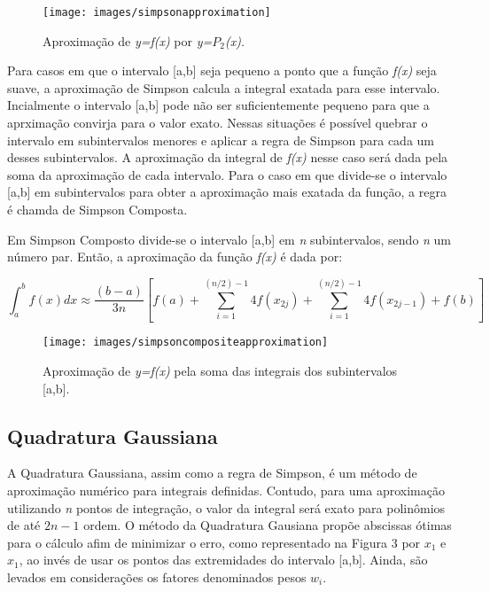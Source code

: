 \documentclass[12pt,a4paper]{article}
\begin{document}
\begin{figure}[h]
\texttt{[image: images/simpsonapproximation]}
\caption{Aproximação de \textit{y=f(x)} por \textit{y=$P_{2}$(x).}}
\end{figure}


\quad Para casos em que o intervalo [a,b] seja pequeno a ponto que a função \textit{f(x)} seja suave, a aproximação de Simpson calcula a integral exatada para esse intervalo. Incialmente o intervalo [a,b] pode não ser suficientemente pequeno para que a aprximação convirja para o valor exato. Nessas situações é possível quebrar o intervalo em subintervalos menores e aplicar a regra de Simpson para cada um desses subintervalos. A aproximação da integral de \textit{f(x)} nesse caso será dada pela soma da aproximação de cada intervalo. Para o caso em que divide-se o intervalo [a,b] em subintervalos para obter a aproximação mais exatada da função, a regra é chamda de Simpson Composta.\\

\newpage

\quad Em Simpson Composto divide-se o intervalo [a,b] em \textit{n} subintervalos, sendo \textit{n} um número par. Então, a aproximação da função \textit{f(x)} é dada por:

\begin{equation}
\int_{a}^{b} f(x)dx \approx \dfrac{(b-a)}{3n} [f(a) + \sum_{i=1}^{(n/2)-1}4f(x_{2j})+ \sum_{i=1}^{(n/2)-1}4f(x_{2j-1}) + f(b)] 
\end{equation}

\begin{figure}[h]
\texttt{[image: images/simpsoncompositeapproximation]}
\caption{Aproximação de \textit{y=f(x)} pela soma das integrais dos subintervalos [a,b].}
\end{figure}

\newpage
\subsection{Quadratura Gaussiana}

\qquad A Quadratura Gaussiana, assim como a regra de Simpson, é um método de aproximação numérico para integrais definidas. Contudo, para uma aproximação utilizando \textit{n} pontos de integração, o valor da integral será exato para polinômios de até $2\textit{n}-1$ ordem. O método da Quadratura Gausiana propõe abscissas ótimas para o cálculo afim de minimizar o erro, como representado na Figura 3 por $x_{1}$ e $x_{1}$, ao invés de usar os pontos das extremidades do intervalo [a,b]. Ainda, são levados em considerações os fatores denominados pesos $w_{i}$. 
\end{document}
